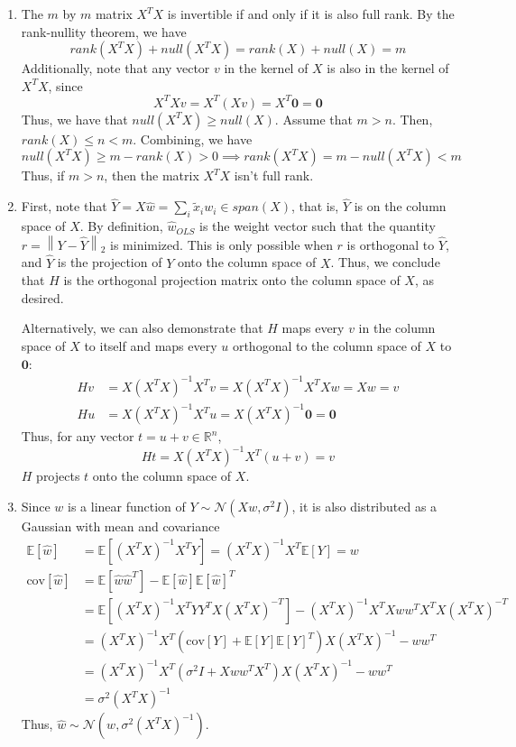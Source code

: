 \documentclass[submit]{harvardml}
\newcommand{\R}{\mathbb{R}}
\newcommand{\E}{\mathbb{E}}
\newcommand{\cov}{\text{cov}}
\newcommand{\N}{\mathcal{N}}
\newcommand{\norm}[1]{\left\lVert#1\right\rVert}
\begin{document}
\begin{enumerate}[label=(\alph*)]
	\item The $m$ by $m$ matrix $X^TX$ is invertible if and only if it is also full rank. By the rank-nullity theorem, we have
	\[ 
	rank(X^TX) + null(X^TX) = rank(X) + null(X) = m 
	\]
	Additionally, note that any vector $v$ in the kernel of $X$ is also in the kernel of $X^TX$, since 
	\[X^TXv = X^T(Xv) = X^T\bm{0} = \bm{0}\]
	Thus, we have that $null(X^TX)\geq null(X)$. Assume that $m > n$. Then, $rank(X) \leq n < m$. Combining, we have
	\[null(X^TX)\geq m - rank(X) > 0 \implies rank(X^TX) = m - null(X^TX) < m\]
	Thus, if $m > n$, then the matrix $X^TX$ isn't full rank. 
	
	\item First, note that $\hat{Y} = X\hat{w} = \sum_i \tilde{x}_i w_i\in span(X)$, that is, $\hat{Y}$ is on the column space of $X$. By definition, $\hat{w}_{OLS}$ is the weight vector such that the quantity $r = \norm{Y - \hat{Y}}_2$ is minimized. This is only possible when $r$ is orthogonal to $\hat{Y}$, and $\hat{Y}$ is the projection of $Y$ onto the column space of $X$. Thus, we conclude that $H$ is the orthogonal projection matrix onto the column space of $X$, as desired. 
	
	Alternatively, we can also demonstrate that $H$ maps every $v$ in the column space of $X$ to itself and maps every $u$ orthogonal to the column space of $X$ to $\bm{0}$:
	\begin{align*}
	Hv &= X(X^TX)^{-1}X^Tv = X(X^TX)^{-1}X^TXw = Xw = v \\
	Hu &= X(X^TX)^{-1}X^Tu = X(X^TX)^{-1}\bm{0} = \bm{0}
	\end{align*}
	Thus, for any vector $t = u + v\in\R^n$, 
	\[ Ht = X(X^TX)^{-1}X^T(u + v) = v \]
	$H$ projects $t$ onto the column space of $X$.
	 
	\item Since $w$ is a linear function of $Y \sim \N(Xw, \sigma^2 I)$, it is also distributed as a Gaussian with mean and covariance
	\begin{align*}
	\E[\hat{w}] &= \E[(X^TX)^{-1}X^TY] = (X^TX)^{-1}X^T\E[Y] = w \\
	\cov[\hat{w}] &= \E[\hat{w}\hat{w}^T] - \E[\hat{w}]\E[\hat{w}]^T \\
	&= \E[(X^TX)^{-1}X^TY Y^TX (X^TX)^{-T}] - (X^TX)^{-1}X^TXw w^TX^TX(X^TX)^{-T} \\
	&= (X^TX)^{-1}X^T (\cov[Y] + \E[Y]\E[Y]^T) X(X^TX)^{-1}
	- w w^T \\
	&= (X^TX)^{-1}X^T (\sigma^2I + Xww^TX^T) X(X^TX)^{-1}
	- w w^T \\
	&= \sigma^2(X^TX)^{-1}
	\end{align*}
	Thus, $\hat{w}\sim\mathcal{N}(w, \sigma^2(X^TX)^{-1})$. 
	

\end{enumerate}
\end{document}
